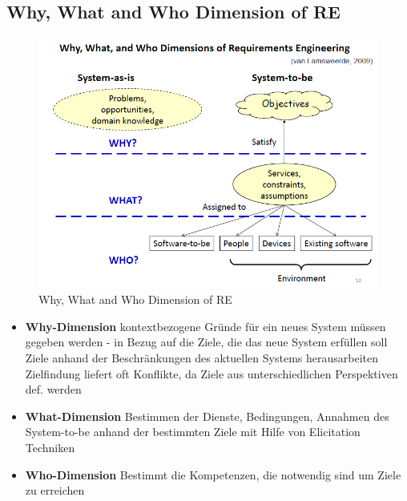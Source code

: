 \subsection{Why, What and Who Dimension of RE}
\begin{figure}[h]
	\centering
	\includegraphics[scale=0.5]{img/re_dimensions.png}
	\caption{Why, What and Who Dimension of RE}
\end{figure}
\begin{itemize}
	\item \textbf{Why-Dimension} kontextbezogene Gründe für ein neues System müssen gegeben werden - in Bezug auf die Ziele, die das neue System erfüllen soll\\
	Ziele anhand der Beschränkungen des aktuellen Systems herausarbeiten\\
	Zielfindung liefert oft Konflikte, da Ziele aus unterschiedlichen Perspektiven def. werden
	
	\item \textbf{What-Dimension} Bestimmen der Dienste, Bedingungen, Annahmen des System-to-be anhand der bestimmten Ziele mit Hilfe von Elicitation Techniken
	
	\item \textbf{Who-Dimension} Bestimmt die Kompetenzen, die notwendig sind um Ziele zu erreichen
\end{itemize}

